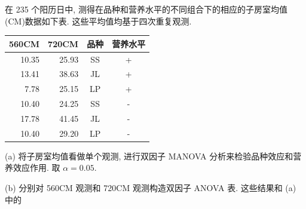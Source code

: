 在 235 个阳历日中, 测得在品种和营养水平的不同组合下的相应的子房室均值(CM)数据如下表. 这些平均值均基于四次重复观测.

\begin{mvtable}
\begin{tabular}{rrcc}
\toprule
560CM & 720CM & 品种 & 营养水平\\\midrule
10.35 & 25.93 & SS & +\\
13.41 & 38.63 & JL & +\\
7.78 & 25.15 & LP & +\\
10.40 & 24.25 & SS & -\\
17.78 & 41.45 & JL & -\\
10.40 & 29.20 & LP & -\\
\bottomrule
\end{tabular}
\end{mvtable}

\noindent (a) 将子房室均值看做单个观测, 进行双因子 MANOVA 分析来检验品种效应和营养效应作用. 取 $\alpha=0.05$.

\noindent (b) 分别对 560CM 观测和 720CM 观测构造双因子 ANOVA 表. 这些结果和 (a) 中的
